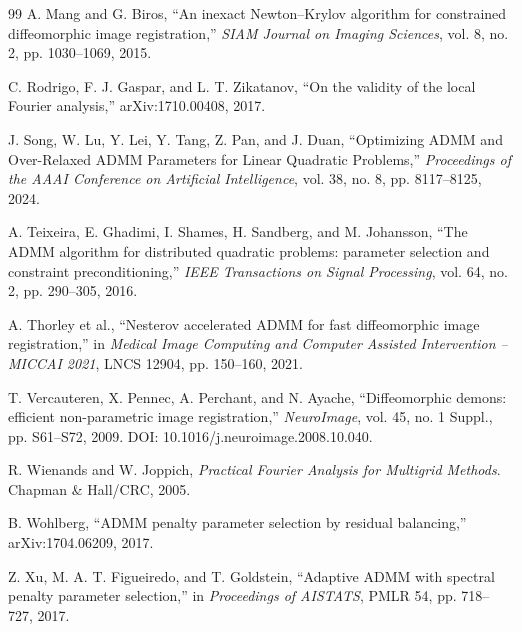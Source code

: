 \documentclass[pdflatex,iicol,sn-mathphys-num]{sn-jnl}
\theoremstyle{definition}\newtheorem{definition}[theorem]{Definition}\newtheorem{remark}[theorem]{Remark}
\begin{document}
\begin{thebibliography}{99}
A. Mang and G. Biros,
``An inexact Newton--Krylov algorithm for constrained diffeomorphic image registration,''
\emph{SIAM Journal on Imaging Sciences}, vol. 8, no. 2, pp. 1030--1069, 2015.

C. Rodrigo, F. J. Gaspar, and L. T. Zikatanov,
``On the validity of the local Fourier analysis,''
arXiv:1710.00408, 2017.

J. Song, W. Lu, Y. Lei, Y. Tang, Z. Pan, and J. Duan,
``Optimizing ADMM and Over-Relaxed ADMM Parameters for Linear Quadratic Problems,''
\emph{Proceedings of the AAAI Conference on Artificial Intelligence}, vol. 38, no. 8, pp. 8117--8125, 2024.

A. Teixeira, E. Ghadimi, I. Shames, H. Sandberg, and M. Johansson,
``The ADMM algorithm for distributed quadratic problems: parameter selection and constraint preconditioning,''
\emph{IEEE Transactions on Signal Processing}, vol. 64, no. 2, pp. 290--305, 2016.

A. Thorley et al.,
``Nesterov accelerated ADMM for fast diffeomorphic image registration,''
in \emph{Medical Image Computing and Computer Assisted Intervention -- MICCAI 2021}, LNCS 12904, pp. 150--160, 2021.

T. Vercauteren, X. Pennec, A. Perchant, and N. Ayache,
``Diffeomorphic demons: efficient non-parametric image registration,''
\emph{NeuroImage}, vol. 45, no. 1 Suppl., pp. S61--S72, 2009.
DOI: 10.1016/j.neuroimage.2008.10.040.

R. Wienands and W. Joppich,
\emph{Practical Fourier Analysis for Multigrid Methods}.
Chapman \& Hall/CRC, 2005.

B. Wohlberg,
``ADMM penalty parameter selection by residual balancing,''
arXiv:1704.06209, 2017.

Z. Xu, M. A. T. Figueiredo, and T. Goldstein,
``Adaptive ADMM with spectral penalty parameter selection,''
in \emph{Proceedings of AISTATS}, PMLR 54, pp. 718--727, 2017.
\end{thebibliography}
\end{document}
